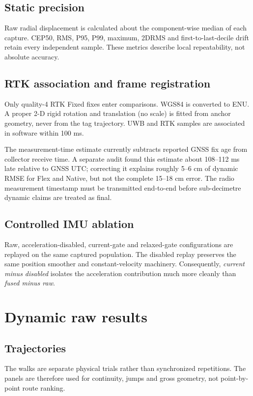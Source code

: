 \documentclass[10pt,a4paper]{article}
\begin{document}
\subsection{Static precision}
Raw radial displacement is calculated about the component-wise median of each
capture. CEP50, RMS, P95, P99, maximum, 2DRMS and first-to-last-decile drift
retain every independent sample. These metrics describe local repeatability,
not absolute accuracy.

\subsection{RTK association and frame registration}
Only quality-4 RTK Fixed fixes enter comparisons. WGS84 is converted to ENU. A
proper 2-D rigid rotation and translation (no scale) is fitted from anchor
geometry, never from the tag trajectory. UWB and RTK samples are associated in
software within 100 ms.

The measurement-time estimate currently subtracts reported GNSS fix age from
collector receive time. A separate audit found this estimate about 108--112 ms
late relative to GNSS UTC; correcting it explains roughly 5--6 cm of dynamic
RMSE for Flex and Native, but not the complete 15--18 cm error. The radio
measurement timestamp must be transmitted end-to-end before sub-decimetre
dynamic claims are treated as final.

\subsection{Controlled IMU ablation}
Raw, acceleration-disabled, current-gate and relaxed-gate configurations are
replayed on the same captured population. The disabled replay preserves the
same position smoother and constant-velocity machinery. Consequently,
\emph{current minus disabled} isolates the acceleration contribution much more
cleanly than \emph{fused minus raw}.

\section{Dynamic raw results}

\subsection{Trajectories}
The walks are separate physical trials rather than synchronized repetitions.
The panels are therefore used for continuity, jumps and gross geometry, not
point-by-point route ranking.
\end{document}
